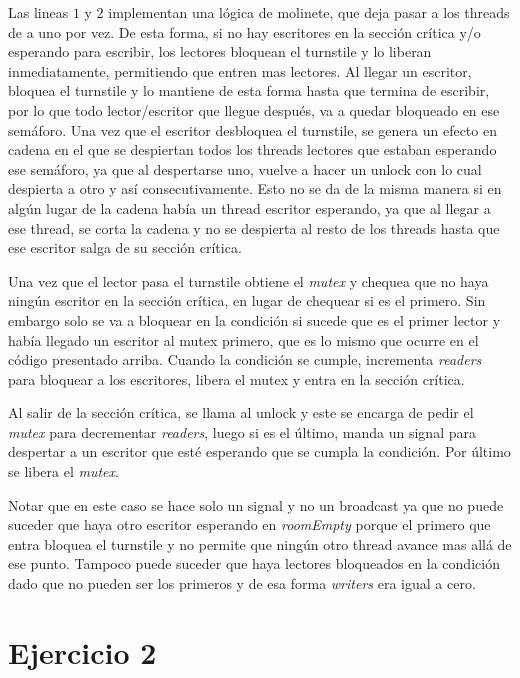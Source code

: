 \documentclass[a4paper,11pt]{article}
\begin{document}

Las lineas $1$ y $2$ implementan una lógica de molinete, que deja pasar a los threads de a uno por vez. De esta forma, si no hay escritores en la sección crítica y/o esperando para escribir, los lectores bloquean el turnstile y lo liberan inmediatamente, permitiendo que entren mas lectores. Al llegar un escritor, bloquea el turnstile y lo mantiene de esta forma hasta que termina de escribir, por lo que todo lector/escritor que llegue después, va a quedar bloqueado en ese semáforo. Una vez que el escritor desbloquea el turnstile, se genera un efecto en cadena en el que se despiertan todos los threads lectores que estaban esperando ese semáforo, ya que al despertarse uno, vuelve a hacer un unlock con lo cual despierta a otro y así consecutivamente. Esto no se da de la misma manera si en algún lugar de la cadena había un thread escritor esperando, ya que al llegar a ese thread, se corta la cadena y no se despierta al resto de los threads hasta que ese escritor salga de su sección crítica.

Una vez que el lector pasa el turnstile obtiene el \emph{mutex} y chequea que no haya ningún escritor en la sección crítica, en lugar de chequear si es el primero. Sin embargo solo se va a bloquear en la condición si sucede que es el primer lector y había llegado un escritor al mutex primero, que es lo mismo que ocurre en el código presentado arriba. Cuando la condición se cumple, incrementa \emph{readers} para bloquear a los escritores, libera el mutex y entra en la sección crítica.

Al salir de la sección crítica, se llama al unlock y este se encarga de pedir el \emph{mutex} para decrementar \emph{readers}, luego si es el último, manda un signal para despertar a un escritor que esté esperando que se cumpla la condición. Por último se libera el \emph{mutex}.

Notar que en este caso se hace solo un signal y no un broadcast ya que no puede suceder que haya otro escritor esperando en \emph{roomEmpty} porque el primero que entra bloquea el turnstile y no permite que ningún otro thread avance mas allá de ese punto. Tampoco puede suceder que haya lectores bloqueados en la condición dado que no pueden ser los primeros y de esa forma \emph{writers} era igual a cero.

\section{Ejercicio 2}
\end{document}
